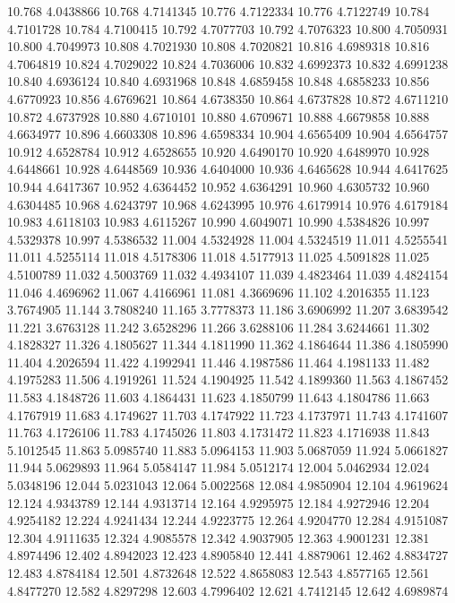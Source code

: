 10.768 4.0438866
10.768 4.7141345
10.776 4.7122334
10.776 4.7122749
10.784 4.7101728
10.784 4.7100415
10.792 4.7077703
10.792 4.7076323
10.800 4.7050931
10.800 4.7049973
10.808 4.7021930
10.808 4.7020821
10.816 4.6989318
10.816 4.7064819
10.824 4.7029022
10.824 4.7036006
10.832 4.6992373
10.832 4.6991238
10.840 4.6936124
10.840 4.6931968
10.848 4.6859458
10.848 4.6858233
10.856 4.6770923
10.856 4.6769621
10.864 4.6738350
10.864 4.6737828
10.872 4.6711210
10.872 4.6737928
10.880 4.6710101
10.880 4.6709671
10.888 4.6679858
10.888 4.6634977
10.896 4.6603308
10.896 4.6598334
10.904 4.6565409
10.904 4.6564757
10.912 4.6528784
10.912 4.6528655
10.920 4.6490170
10.920 4.6489970
10.928 4.6448661
10.928 4.6448569
10.936 4.6404000
10.936 4.6465628
10.944 4.6417625
10.944 4.6417367
10.952 4.6364452
10.952 4.6364291
10.960 4.6305732
10.960 4.6304485
10.968 4.6243797
10.968 4.6243995
10.976 4.6179914
10.976 4.6179184
10.983 4.6118103
10.983 4.6115267
10.990 4.6049071
10.990 4.5384826
10.997 4.5329378
10.997 4.5386532
11.004 4.5324928
11.004 4.5324519
11.011 4.5255541
11.011 4.5255114
11.018 4.5178306
11.018 4.5177913
11.025 4.5091828
11.025 4.5100789
11.032 4.5003769
11.032 4.4934107
11.039 4.4823464
11.039 4.4824154
11.046 4.4696962
11.067 4.4166961
11.081 4.3669696
11.102 4.2016355
11.123 3.7674905
11.144 3.7808240
11.165 3.7778373
11.186 3.6906992
11.207 3.6839542
11.221 3.6763128
11.242 3.6528296
11.266 3.6288106
11.284 3.6244661
11.302 4.1828327
11.326 4.1805627
11.344 4.1811990
11.362 4.1864644
11.386 4.1805990
11.404 4.2026594
11.422 4.1992941
11.446 4.1987586
11.464 4.1981133
11.482 4.1975283
11.506 4.1919261
11.524 4.1904925
11.542 4.1899360
11.563 4.1867452
11.583 4.1848726
11.603 4.1864431
11.623 4.1850799
11.643 4.1804786
11.663 4.1767919
11.683 4.1749627
11.703 4.1747922
11.723 4.1737971
11.743 4.1741607
11.763 4.1726106
11.783 4.1745026
11.803 4.1731472
11.823 4.1716938
11.843 5.1012545
11.863 5.0985740
11.883 5.0964153
11.903 5.0687059
11.924 5.0661827
11.944 5.0629893
11.964 5.0584147
11.984 5.0512174
12.004 5.0462934
12.024 5.0348196
12.044 5.0231043
12.064 5.0022568
12.084 4.9850904
12.104 4.9619624
12.124 4.9343789
12.144 4.9313714
12.164 4.9295975
12.184 4.9272946
12.204 4.9254182
12.224 4.9241434
12.244 4.9223775
12.264 4.9204770
12.284 4.9151087
12.304 4.9111635
12.324 4.9085578
12.342 4.9037905
12.363 4.9001231
12.381 4.8974496
12.402 4.8942023
12.423 4.8905840
12.441 4.8879061
12.462 4.8834727
12.483 4.8784184
12.501 4.8732648
12.522 4.8658083
12.543 4.8577165
12.561 4.8477270
12.582 4.8297298
12.603 4.7996402
12.621 4.7412145
12.642 4.6989874
